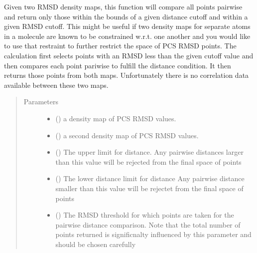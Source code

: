 \documentclass[a4paper,10pt,english,openany,oneside]{sphinxmanual}
\begin{document}
\begin{fulllineitems}
\label{\detokenize{reference/generated/paramagpy.fit.gridsearch_fit_atom_restrain_distance_cutoff:paramagpy.fit.gridsearch_fit_atom_restrain_distance_cutoff}}
Given two RMSD density maps, this function will compare
all points pairwise and return only those within the bounds of
a given distance cutoff and within a given RMSD cutoff.
This might be useful if two density maps for separate atoms
in a molecule are known to be constrained w.r.t. one another
and you would like to use that restraint to further restrict
the space of PCS RMSD points.
The calculation first selects points with an RMSD less than
the given cutoff value and then compares each point pariwise to
fulfill the distance condition. It then returns those points
from both maps. Unfortunately there is no correlation data
available between these two maps.
\begin{quote}\begin{description}
\item[{Parameters}] \leavevmode\begin{itemize}
\item {} 
 () \textendash{} a density map of PCS RMSD values.

\item {} 
 () \textendash{} a second density map of PCS RMSD values.

\item {} 
 () \textendash{} The upper limit for distance.
Any pairwise distances larger than this value
will be rejected from the final space of points

\item {} 
 () \textendash{} The lower distance limit for distance
Any pairwise distance smaller than this value
will be rejectet from the final space of points

\item {} 
 () \textendash{} The RMSD threshold for which points are taken
for the pairwise distance comparison.
Note that the total number of points returned
is significnalty influenced by this parameter
and should be chosen carefully


\end{itemize}
\end{description}
\end{quote}
\end{fulllineitems}
\end{document}
